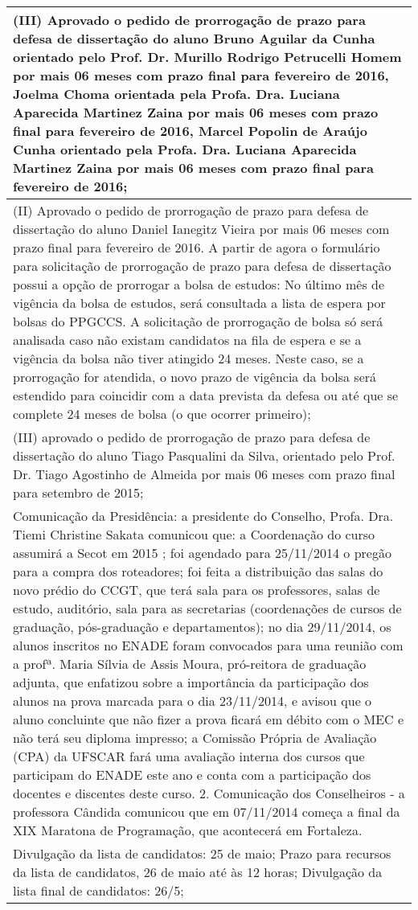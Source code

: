 
\begin{longtable}{|p{17.5cm}|}
\hline 
(III) Aprovado o pedido de prorrogação de prazo para defesa de dissertação do aluno Bruno Aguilar da Cunha orientado pelo Prof. Dr. Murillo Rodrigo Petrucelli Homem por mais 06 meses com prazo final para fevereiro de 2016, Joelma Choma orientada pela Profa. Dra. Luciana Aparecida Martinez Zaina por mais 06 meses com prazo final para fevereiro de 2016, Marcel Popolin de Araújo Cunha orientado pela Profa. Dra. Luciana Aparecida Martinez Zaina por mais 06 meses com prazo final para fevereiro de 2016;

 \\ \hline 
(II) Aprovado o pedido de prorrogação de prazo para defesa de dissertação do aluno Daniel Ianegitz Vieira por mais 06 meses com prazo final para fevereiro de 2016. A partir de agora o formulário para solicitação de prorrogação de prazo para defesa de dissertação possui a opção de prorrogar a bolsa de estudos: No último mês de vigência da bolsa de estudos, será consultada a lista de espera por bolsas do PPGCCS. A solicitação de prorrogação de bolsa só será analisada caso não existam candidatos na fila de espera e se a vigência da bolsa não tiver atingido 24 meses. Neste caso, se a prorrogação for atendida, o novo prazo de vigência da bolsa será estendido para coincidir com a data prevista da defesa ou até que se complete 24 meses de bolsa (o que ocorrer primeiro);

 \\ \hline 
(III) aprovado o pedido de prorrogação de prazo para defesa de dissertação do aluno Tiago Pasqualini da Silva, orientado pelo Prof. Dr. Tiago Agostinho de Almeida por mais 06 meses com prazo final para setembro de 2015;

 \\ \hline 
Comunicação da Presidência: a presidente do Conselho, Profa. Dra. Tiemi Christine Sakata comunicou que: a Coordenação do curso assumirá a Secot em 2015 ; foi agendado para 25/11/2014 o pregão para a compra dos roteadores; foi feita a distribuição das salas do novo prédio do CCGT, que terá sala para os professores, salas de estudo, auditório, sala para as secretarias (coordenações de cursos de graduação, pós-graduação e departamentos); no dia 29/11/2014, os alunos inscritos no ENADE foram convocados para uma reunião com a profª. Maria Sílvia de Assis Moura, pró-reitora de graduação adjunta, que enfatizou sobre a importância da participação dos alunos na prova marcada para o dia 23/11/2014, e avisou que o aluno concluinte que não fizer a prova ficará em débito com o MEC e não terá seu diploma impresso; a Comissão Própria de Avaliação (CPA) da UFSCAR fará uma avaliação interna dos cursos que participam do ENADE este ano e conta com a participação dos docentes e discentes deste curso. 2. Comunicação dos Conselheiros - a professora Cândida comunicou que em 07/11/2014 começa a final da XIX Maratona de Programação, que acontecerá em Fortaleza.

 \\ \hline 
Divulgação da lista de candidatos: 25 de maio; Prazo para recursos da lista de candidatos, 26 de maio até às 12 horas; Divulgação da lista final de candidatos: 26/5;

 \\ \hline 

\end{longtable} 




